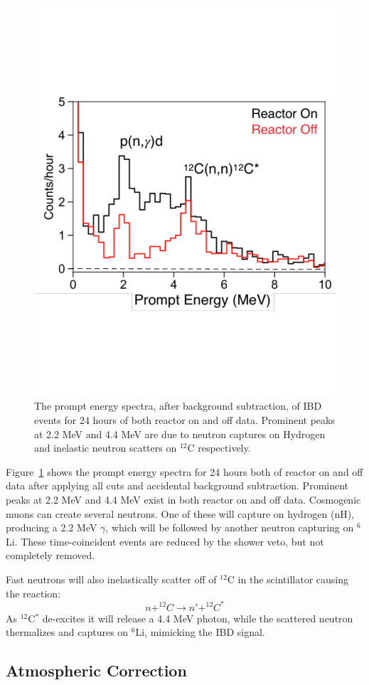 \begin{figure}[!b]
	\centering
	\includegraphics[width=0.6\linewidth]{tex/7-oscillation-images/IBD_E}
	\caption{The prompt energy spectra, after background subtraction, of IBD events for 24 hours of both reactor on and off data. Prominent peaks at 2.2 MeV and 4.4 MeV are due to neutron captures on Hydrogen and inelastic neutron scatters on $^{12}$C respectively.}
	\label{fig:ibde}
\end{figure}

Figure~\ref{fig:ibde} shows the prompt energy spectra for 24 hours both of reactor on and off data after applying all cuts and accidental background subtraction.
Prominent peaks at 2.2 MeV and 4.4 MeV exist in both reactor on and off data.
Cosmogenic muons can create several neutrons. One of these will capture on hydrogen (nH), producing a 2.2 MeV $\gamma$, which will be followed by another neutron capturing on $^6$Li. 
These time-coincident events are reduced by the shower veto, but not completely removed.

Fast neutrons will also inelastically scatter off of $^{12}$C in the scintillator causing the reaction:
\begin{equation}
	n + ^{12}C \rightarrow n' + ^{12}C^*
\end{equation}
As $^{12}$C$^*$ de-excites it will release a 4.4 MeV photon, while the scattered neutron thermalizes and captures on $^{6}$Li, mimicking the IBD signal.


\subsection{Atmospheric Correction}


